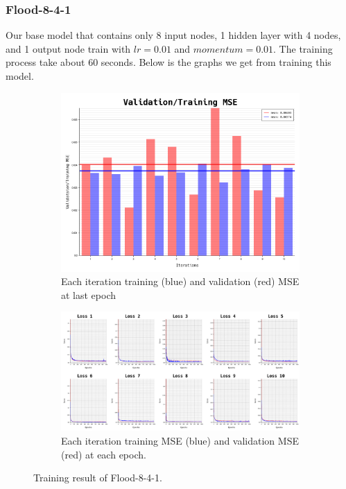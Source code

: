 \documentclass{article}
\begin{document}
\subsubsection*{Flood-8-4-1}
Our base model that contains only 8 input nodes, 1 hidden layer with 4 nodes, and 1 output node train with $lr = 0.01$ and $momentum = 0.01$.
The training process take about $60$ seconds. Below is the graphs we get from training this model. 
\begin{figure}[ht]
	\begin{subfigure}{\textwidth}
		\centering
		\includegraphics[scale=0.3]{flood-8-4-1/cv_l}
		\caption{Each iteration training (blue) and validation (red) MSE at last epoch}
		\label{fig:2a}
	\end{subfigure}
	\begin{subfigure}{\textwidth}
		\includegraphics[width=\textwidth]{flood-8-4-1/loss}
		\caption{Each iteration training MSE (blue) and validation MSE (red) at each epoch.}
		\label{fig:2b}
	\end{subfigure}
	\caption{Training result of Flood-8-4-1.}
	\label{fig:2}
\end{figure}
\FloatBarrier
\end{document}
